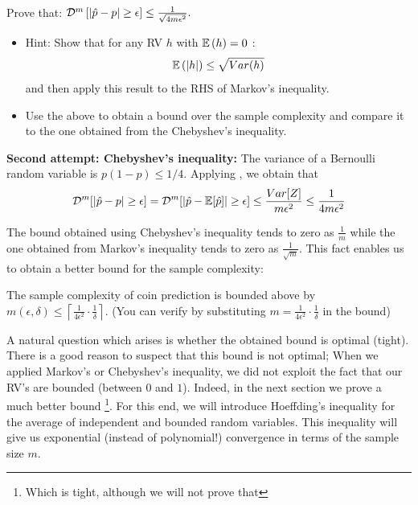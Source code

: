 \vspace{5mm}

\begin{exercise}
Prove that:  $\mathcal{D}^m \left[|\hat{p}-p| \geq \epsilon \right]  \le \frac{1}{\sqrt{4m\epsilon^2}}.$ 
\end{exercise}

\begin{itemize}
	\item Hint: Show that for any RV $h$ with $\mathbb{E}\,(h)=0$ :
$$\mathbb{E}\,(|h|) \le \sqrt{ Var(h)}$$
and then apply this result to the RHS of Markov's inequality.

	\item Use the above to obtain a bound over the sample complexity and compare it to the one obtained from the Chebyshev's inequality.
\end{itemize} 
\color{black}

\noindent \textbf{Second attempt: Chebyshev's inequality: }
The variance of a Bernoulli random variable is $p(1-p) \le 1/4$. Applying , we obtain that
$$ \mathcal{D}^m [|\hat{p}-p| \ge \epsilon] = \mathcal{D}^m[|\hat{p}-\mathbb{E} [\hat{p}]| \ge \epsilon] \le \frac{Var[Z]}{m\epsilon^2} \le \frac{1}{4m \epsilon ^2}$$

The bound obtained using Chebyshev's inequality tends to zero as $\frac{1}{m}$ while the one obtained from Markov's inequality tends to zero as $\frac{1}{\sqrt{m}}$.
This fact enables us to obtain a better bound for the sample complexity:

\begin{corollary}  \label{cor:basicConcentration}
The sample complexity of coin prediction is bounded above by
$m(\epsilon,\delta) \le \left \lceil \frac{1}{4\epsilon^2} \cdot
  \frac{1}{\delta} \right \rceil$.
  (You can verify by substituting $m=\frac{1}{4\epsilon^2} \cdot
  \frac{1}{\delta}$ in the bound)
\end{corollary}


\color{black}


A natural question which arises is whether the obtained bound is optimal (tight). There is a good reason to suspect that this bound is not optimal; When we applied Markov's or Chebyshev's inequality, we did not exploit the fact that our RV's are bounded (between $0$ and $1$).  Indeed, in the next section we prove a much better bound \footnote{Which is tight, although we will not prove that}. For this end, we will introduce Hoeffding's inequality for the average of independent and bounded random variables. This inequality will give us exponential (instead of polynomial!) convergence in terms of the sample size $m$.

